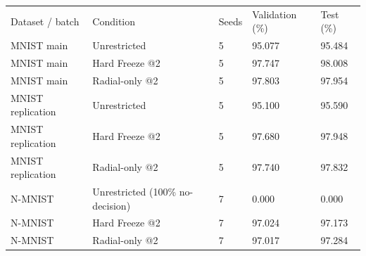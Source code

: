 \begin{tabular}{lllll}
\hline
Dataset / batch & Condition & Seeds & Validation (\%) & Test (\%) \\
MNIST main & Unrestricted & 5 & 95.077 & 95.484 \\
MNIST main & Hard Freeze @2 & 5 & 97.747 & 98.008 \\
MNIST main & Radial-only @2 & 5 & 97.803 & 97.954 \\
MNIST replication & Unrestricted & 5 & 95.100 & 95.590 \\
MNIST replication & Hard Freeze @2 & 5 & 97.680 & 97.948 \\
MNIST replication & Radial-only @2 & 5 & 97.740 & 97.832 \\
N-MNIST & Unrestricted (100\% no-decision) & 7 & 0.000 & 0.000 \\
N-MNIST & Hard Freeze @2 & 7 & 97.024 & 97.173 \\
N-MNIST & Radial-only @2 & 7 & 97.017 & 97.284 \\
\hline
\end{tabular}
